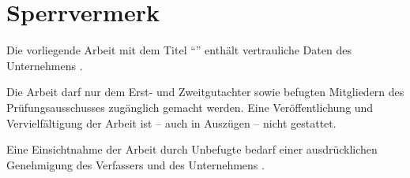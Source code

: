
\chapter*{Sperrvermerk}

Die vorliegende Arbeit mit dem Titel "`\myTitle"' enthält vertrauliche Daten des Unternehmens \myCompany.

Die Arbeit darf nur dem Erst- und Zweitgutachter sowie befugten Mitgliedern des Prüfungsausschusses zugänglich gemacht werden. 
Eine Veröffentlichung und Vervielfältigung der Arbeit ist -- auch in Auszügen -- nicht gestattet.

Eine Einsichtnahme der Arbeit durch Unbefugte bedarf einer ausdrücklichen Genehmigung des Verfassers und des Unternehmens \myCompany.
